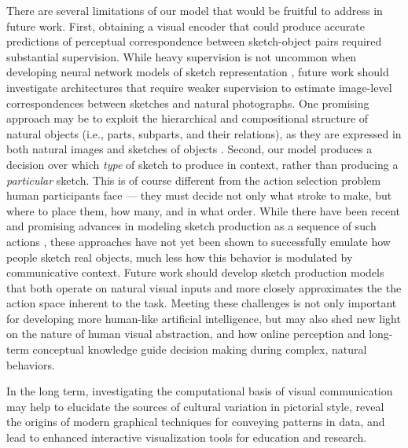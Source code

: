 \documentclass[9pt,twocolumn,twoside]{pnas-new}
\begin{document}

There are several limitations of our model that would be fruitful to address in future work. 
First, obtaining a visual encoder that could produce accurate predictions of perceptual correspondence between sketch-object pairs required substantial supervision. 
While heavy supervision is not uncommon when developing neural network models of sketch representation \cite{sangkloy2016sketchy,yu2017sketch,song2017deep}, future work should investigate architectures that require weaker supervision to estimate image-level correspondences between sketches and natural photographs. 
One promising approach may be to exploit the hierarchical and compositional structure of natural objects (i.e., parts, subparts, and their relations), as they are expressed in both natural images and sketches of objects \cite{battaglia2016interaction,mrowca2018graph}.
Second, our model produces a decision over which \textit{type} of sketch to produce in context, rather than producing a \textit{particular} sketch.  
This is of course different from the action selection problem human participants face --- they must decide not only what stroke to make, but where to place them, how many, and in what order.
While there have been recent and promising advances in modeling sketch production as a sequence of such actions \cite{lake2015human,ha2017neural,ganin2018synthesizing}, these approaches have not yet been shown to successfully emulate how people sketch real objects, much less how this behavior is modulated by communicative context. 
Future work should develop sketch production models that both operate on natural visual inputs and more closely approximates the the action space inherent to the task.
Meeting these challenges is not only important for developing more human-like artificial intelligence, but may also shed new light on the nature of human visual abstraction, and how online perception and long-term conceptual knowledge guide decision making during complex, natural behaviors. 

In the long term, investigating the computational basis of visual communication may help to elucidate the sources of cultural variation in pictorial style, reveal the origins of modern graphical techniques for conveying patterns in data, and lead to enhanced interactive visualization tools for education and research.
\end{document}
